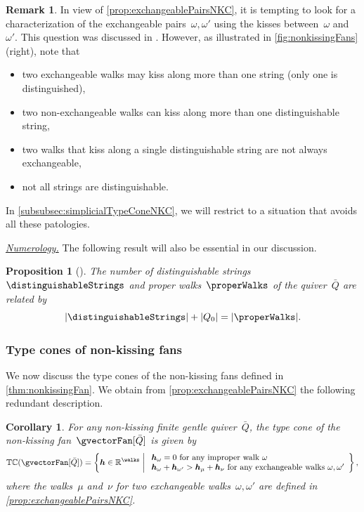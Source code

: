 \documentclass{amsart}
\newtheorem{corollary}[theorem]{Corollary}
\newtheorem{proposition}[theorem]{Proposition}
\theoremstyle{definition}
\newtheorem{remark}[theorem]{Remark}
\newcommand{\R}{\mathbb{R}} %
\renewcommand{\b}[1]{{\boldsymbol{#1}}} %
\newcommand{\set}[2]{\left\{ #1 \;\middle|\; #2 \right\}} %
\newcommand{\para}[1]{\medskip\noindent\uline{\textit{#1.}}} %
\newcommand{\vincent}[1]{\todo[color=blue!30]{#1 \\ \hfill --- V.}}
\newcommand{\typeCone}{\mathbb{TC}} %
\newcommand{\quiver}{\bar Q} %
\begin{document}
\begin{remark}
\label{rem:exchangeablePairsNKC}
In view of \cref{prop:exchangeablePairsNKC}, it is tempting to look for a characterization of the exchangeable pairs~$\omega, \omega'$ using the kisses between~$\omega$ and~$\omega'$.
This question was discussed in \cite[Sect.~9]{BrustleDouvilleMousavandThomasYildirim}.
However, as illustrated in \cref{fig:nonkissingFans}\,(right), note that
\begin{itemize}
\item two exchangeable walks may kiss along more than one string (only one is distinguished),
\item two non-exchangeable walks can kiss along more than one distinguishable string,
\item two walks that kiss along a single distinguishable string are not always exchangeable,
\item not all strings are distinguishable.
\end{itemize}
In \cref{subsubsec:simplicialTypeConeNKC}, we will restrict to a situation that avoids all these patologies.
\end{remark}

\para{Numerology}
%
The following result will also be essential in our discussion.

\begin{proposition}[{\cite[3.68]{PaluPilaudPlamondon-nonkissing}}]
\label{prop:bijectionStringsWalks}
The number of distinguishable strings~$\distinguishableStrings$ and proper walks~$\properWalks$ of the quiver~$\quiver$ are related by
\[
|\distinguishableStrings| + |Q_0| = |\properWalks|.
\]
\end{proposition}


\subsubsection{Type cones of non-kissing fans}

We now discuss the type cones of the non-kissing fans defined in \cref{thm:nonkissingFan}. We obtain from \cref{prop:exchangeablePairsNKC} the following redundant description.

\begin{corollary}
For any non-kissing finite gentle quiver~$\quiver$, the type cone of the non-kissing fan~$\gvectorFan[\quiver]$ is given by
\[
\typeCone(\gvectorFan[\quiver]) = \set{\b{h} \in \R^{\walks}}{\begin{array}{l} \b{h}_\omega = 0 \text{ for any improper walk } \omega \\ \b{h}_\omega + \b{h}_{\omega'} > \b{h}_\mu + \b{h}_\nu \text{ for any exchangeable walks } \omega, \omega' \end{array}},
\]
where the walks~$\mu$ and~$\nu$ for two exchangeable walks~$\omega, \omega'$ are defined in \cref{prop:exchangeablePairsNKC}.
\end{corollary}
\end{document}

